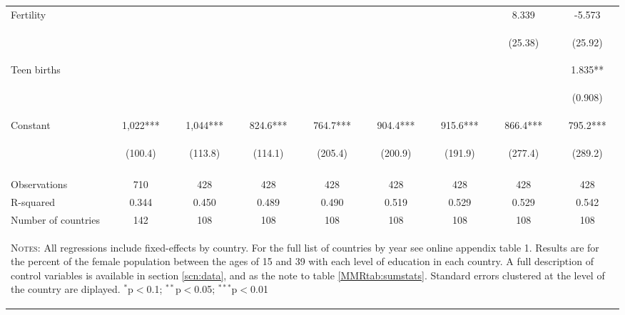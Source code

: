 \begin{landscape}
\begin{table}[htpb!]
\begin{center}
\begin{tabular}{lcccccccc}
Fertility&&&&&&&8.339&-5.573\\
&&&&&&&\begin{footnotesize}(25.38)\end{footnotesize}&\begin{footnotesize}(25.92)\end{footnotesize}\\
Teen births&&&&&&&&1.835**\\
&&&&&&&&\begin{footnotesize}(0.908)\end{footnotesize}\\
Constant&1,022***&1,044***&824.6***&764.7***&904.4***&915.6***&866.4***&795.2***\\
&\begin{footnotesize}(100.4)\end{footnotesize}&\begin{footnotesize}(113.8)\end{footnotesize}&\begin{footnotesize}(114.1)\end{footnotesize}&\begin{footnotesize}(205.4)\end{footnotesize}&\begin{footnotesize}(200.9)\end{footnotesize}&\begin{footnotesize}(191.9)\end{footnotesize}&\begin{footnotesize}(277.4)\end{footnotesize}&\begin{footnotesize}(289.2)\end{footnotesize}\\
&&&&&&&&\\
Observations&710&428&428&428&428&428&428&428\\
R-squared&0.344&0.450&0.489&0.490&0.519&0.529&0.529&0.542\\
Number of countries&142&108&108&108&108&108&108&108\\
\midrule
\multicolumn{9}{p{20cm}}{\begin{footnotesize}\textsc{Notes:} All regressions include fixed-effects by country. For the full list of countries by year see online appendix table 1.  Results are for the percent of the female population between the ages of  15 and 39 with each level of education in each country.  A full description of control variables is available in section \ref{scn:data}, and as the note to table \ref{MMRtab:sumstats}.  Standard errors clustered at the level of the country are diplayed.
$^{*}$p$<$0.1; $^{**}$p$<$0.05; $^{***}$p$<$0.01\end{footnotesize}} \\ \bottomrule 
\end{tabular}\end{center}\end{table}\end{landscape}

